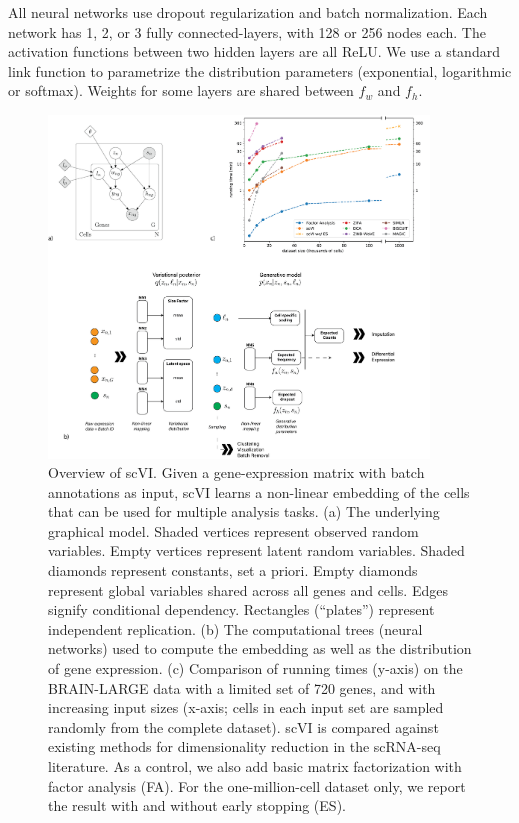 All neural networks use dropout regularization and batch normalization. Each network has 1, 2, or 3 fully connected-layers, with 128 or 256 nodes each. The activation functions between two hidden layers are all ReLU. We use a standard link function to parametrize the distribution parameters (exponential, logarithmic or softmax). Weights for some layers are shared between $f_w$ and $f_h$. 

\begin{figure}
    \centering
    \includegraphics[width=0.9\textwidth]{figures/Figure-1.png}
    \caption[Overview of scVI]{Overview of scVI. Given a gene-expression matrix with batch annotations as input, scVI learns a non-linear embedding of the cells that can be used for multiple analysis tasks. (a) The underlying graphical model. Shaded vertices represent observed random variables. Empty vertices represent latent random variables. Shaded diamonds represent constants, set a priori. Empty diamonds represent global variables shared across all genes and cells. Edges signify conditional dependency. Rectangles (``plates'') represent independent replication. (b) The computational trees (neural networks) used to compute the embedding as well as the distribution of gene expression. (c) Comparison of running times (y-axis) on the BRAIN-LARGE data with a limited set of 720 genes, and with increasing input sizes (x-axis; cells in each input set are sampled randomly from the complete dataset). scVI is compared against existing methods for dimensionality reduction in the scRNA-seq literature. As a control, we also add basic matrix factorization with factor analysis (FA). For the one-million-cell dataset only, we report the result with and without early stopping (ES).}
    \label{scviPanel1}
    \end{figure}
    

